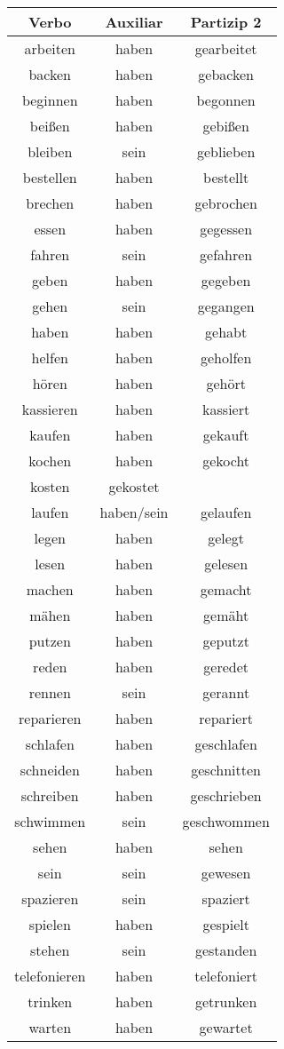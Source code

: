 \begin{tabular}{| c | c | c |}
\hline
\textbf{Verbo} & \textbf{Auxiliar} & \textbf{Partizip 2} \\
\hline
arbeiten & haben & gearbeitet \\
backen & haben & gebacken \\
beginnen & haben & begonnen \\
beißen & haben & gebißen \\
bleiben & sein & geblieben \\
bestellen & haben & bestellt \\
brechen & haben & gebrochen \\
essen & haben & gegessen \\
fahren & sein & gefahren \\
geben & haben & gegeben \\
gehen & sein & gegangen \\
haben & haben & gehabt \\
helfen & haben & geholfen \\
hören & haben & gehört \\
kassieren & haben & kassiert \\
kaufen & haben & gekauft \\
kochen & haben & gekocht \\
kosten & gekostet \\
laufen & haben/sein & gelaufen \\
legen & haben & gelegt \\
lesen & haben & gelesen \\
machen & haben & gemacht \\
mähen & haben & gemäht \\
putzen & haben & geputzt \\
reden & haben & geredet \\
rennen & sein & gerannt \\
reparieren & haben & repariert \\
schlafen & haben & geschlafen \\
schneiden & haben & geschnitten \\
schreiben & haben & geschrieben \\
schwimmen & sein & geschwommen \\
sehen & haben & sehen \\
sein & sein & gewesen \\
spazieren & sein & spaziert \\
spielen & haben & gespielt \\
stehen & sein & gestanden \\
telefonieren & haben & telefoniert \\
trinken & haben & getrunken \\
warten & haben & gewartet \\
\hline
\end{tabular}


